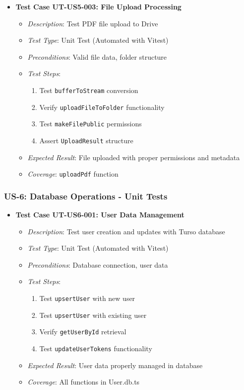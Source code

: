 \documentclass[12pt]{article}
\begin{document}
\begin{itemize}
  \item \textbf{Test Case UT-US5-003: File Upload Processing}
    \begin{itemize}
      \item \textit{Description}: Test PDF file upload to Drive
      \item \textit{Test Type}: Unit Test (Automated with Vitest)
      \item \textit{Preconditions}: Valid file data, folder structure
      \item \textit{Test Steps}:
        \begin{enumerate}
          \item Test \texttt{bufferToStream} conversion
          \item Verify \texttt{uploadFileToFolder} functionality
          \item Test \texttt{makeFilePublic} permissions
          \item Assert \texttt{UploadResult} structure
        \end{enumerate}
      \item \textit{Expected Result}: File uploaded with proper permissions and metadata
      \item \textit{Coverage}: \texttt{uploadPdf} function
    \end{itemize}
\end{itemize}

\subsubsection{US-6: Database Operations - Unit Tests}
\begin{itemize}
  \item \textbf{Test Case UT-US6-001: User Data Management}
    \begin{itemize}
      \item \textit{Description}: Test user creation and updates with Turso database
      \item \textit{Test Type}: Unit Test (Automated with Vitest)
      \item \textit{Preconditions}: Database connection, user data
      \item \textit{Test Steps}:
        \begin{enumerate}
          \item Test \texttt{upsertUser} with new user
          \item Test \texttt{upsertUser} with existing user
          \item Verify \texttt{getUserById} retrieval
          \item Test \texttt{updateUserTokens} functionality
        \end{enumerate}
      \item \textit{Expected Result}: User data properly managed in database
      \item \textit{Coverage}: All functions in User.db.ts
    \end{itemize}
\end{itemize}
\end{document}
